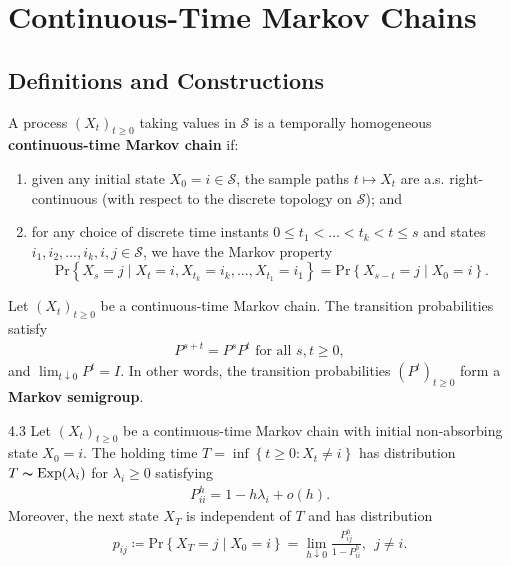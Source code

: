 \section{Continuous-Time Markov Chains}

\subsection{Definitions and Constructions}

\begin{defn}{}{}
A process \((X_{t} )_{t\geq 0}\) taking values in \(\mathcal{S} \) is a temporally homogeneous \textbf{continuous-time Markov chain} if:
\begin{enumerate}[label = \emph{(\roman*)}]
    \item given any initial state \(X_0 = i \in \mathcal{S} \), the sample paths \(t \mapsto X_{t} \) are a.s. right-continuous (with respect to the discrete topology on \(\mathcal{S} \)); and 
    \item for any choice of discrete time instants \(0\leq t_1 < \dots < t_{k} <t \leq s\) and states \(i_1, i_2, \dots , i_k, i , j \in \mathcal{S} \), we have the Markov property
    \[
        \mathrm{Pr} \left\{ X_{s} = j \mid X_{t} = i, X_{t_{k} }= i_{k}, \dots , X_{t_1} = i_1  \right\}  = \mathrm{Pr} \left\{ X_{s - t} = j \mid X_0 = i  \right\}.
    \]
\end{enumerate}


\end{defn}

\begin{thrm}{}{}
    Let \((X_{t} )_{t\geq 0}\) be a continuous-time Markov chain. The transition probabilities satisfy 
    \begin{align*}
        P^{s +t} = P^s P^t \text{ for all } s,t\geq 0,
    \end{align*}
    and \(\lim_{t \downarrow 0} P^t = I \). In other words, the transition probabilities \((P^t)_{t\geq 0}\)  form a \textbf{Markov semigroup}. 
    \end{thrm}

    \begin{thrm}{}{4.3}
    Let \((X_{t} )_{t \geq 0}\) be a continuous-time Markov chain with initial non-absorbing state \(X_0 = i\). The holding time \(T = \inf \left\{ t\geq 0: X_{t} \neq i \right\} \) has distribution \(T \thicksim \mathrm{Exp}(\lambda _{i} )  \) for \(\lambda _{i} \geq 0\) satisfying
    \begin{align*}
        P_{i i }^{h} = 1 - h \lambda _{i} + o(h). 
    \end{align*}
    Moreover, the next state \(X_{T} \) is independent of \(T\) and has distribution \begin{align*}
        p_{ij} \coloneqq \mathrm{Pr} \left\{ X_{T} = j \mid X_0 = i \right\}  = \lim_{h \downarrow 0} \frac{P_{ij}^h }{1 - P_{i i}^h }, \ \ j \neq i. 
    \end{align*}
    
    \end{thrm}

